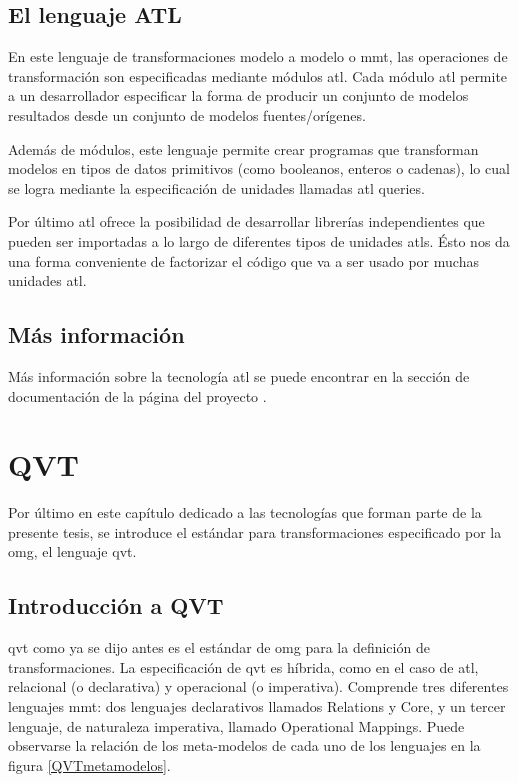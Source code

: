 \documentclass[a4paper,12pt,oneside,spanish]{book}
\begin{document}
\subsection{El lenguaje ATL}

En este lenguaje de transformaciones modelo a modelo o \gls{mmt}, las operaciones de transformación son especificadas mediante módulos \gls{atl}. Cada módulo \gls{atl} permite a un desarrollador especificar la forma de producir un conjunto de modelos resultados desde un conjunto de modelos fuentes/orígenes. 

Además de módulos, este lenguaje permite crear programas que transforman modelos en tipos de datos primitivos (como booleanos, enteros o cadenas), lo cual se logra mediante la especificación de unidades llamadas \gls{atl} queries.

Por último \gls{atl} ofrece la posibilidad de desarrollar librerías independientes que pueden ser importadas a lo largo de diferentes tipos de unidades \glspl{atl}. Ésto nos da una forma conveniente de factorizar el código que va a ser usado por muchas unidades \gls{atl}.


\subsection{Más información}

Más información sobre la tecnología \gls{atl} se puede encontrar en la sección de documentación de la página del proyecto \cite[\url{www.eclipse.org/atl/}]{ATL}.


\section{QVT}

Por último en este capítulo dedicado a las tecnologías que forman parte de la presente tesis, se introduce el estándar para transformaciones especificado por la \gls{omg}, el lenguaje \gls{qvt}.


\subsection{Introducción a QVT}

\gls{qvt} como ya se dijo antes es el estándar de \gls{omg} para la definición de transformaciones. La especificación de \gls{qvt} es híbrida, como en el caso de \gls{atl}, relacional (o declarativa) y operacional (o imperativa). Comprende tres diferentes lenguajes \gls{mmt}: dos lenguajes declarativos llamados Relations y Core, y un tercer lenguaje, de naturaleza imperativa, llamado Operational Mappings. Puede observarse la relación de los meta-modelos de cada uno de los lenguajes en la figura \ref{QVTmetamodelos}. 
\end{document}
